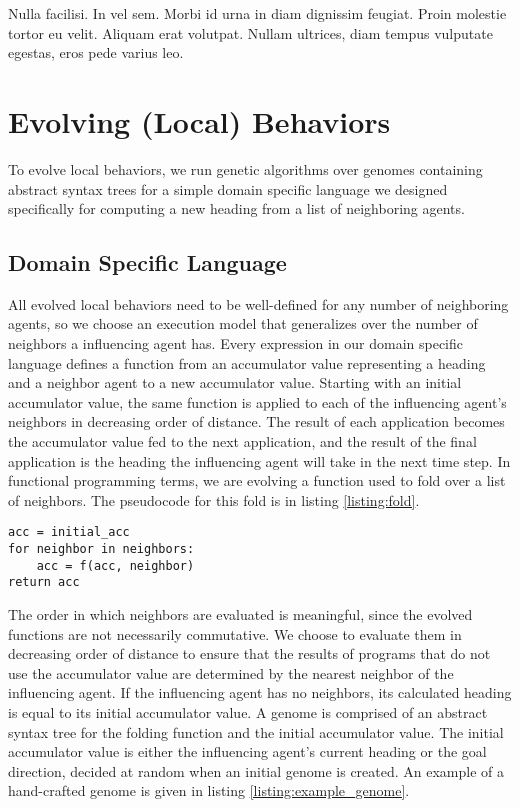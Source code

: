 \begin{savequote}[75mm]
Nulla facilisi. In vel sem. Morbi id urna in diam dignissim feugiat. Proin molestie tortor eu velit. Aliquam erat volutpat. Nullam ultrices, diam tempus vulputate egestas, eros pede varius leo.
\end{savequote}

\chapter{Evolving (Local) Behaviors}

To evolve local behaviors, we run genetic algorithms over genomes containing
abstract syntax trees for a simple domain specific language we designed
specifically for computing a new heading from a list of neighboring agents.

\section{Domain Specific Language}
\label{sec:language}
All evolved local behaviors need to be well-defined for any number of
neighboring agents, so we choose an execution model that generalizes over the
number of neighbors a influencing agent has.
Every expression in our domain specific language defines a function from an
accumulator value representing a heading and a neighbor agent to a new
accumulator value.
Starting with an initial accumulator value, the same function is applied to
each of the influencing agent's neighbors in decreasing order of distance.
The result of each application becomes the accumulator value fed to the next
application, and the result of the final application is the heading the
influencing agent will take in the next time step.
In functional programming terms, we are evolving a function used to fold over a
list of neighbors.
The pseudocode for this fold is in listing \ref{listing:fold}.

\begin{lstlisting}[caption={A fold},captionpos=b,label={listing:fold}]
acc = initial_acc
for neighbor in neighbors:
    acc = f(acc, neighbor)
return acc
\end{lstlisting}

The order in which neighbors are evaluated is meaningful, since the evolved
functions are not necessarily commutative.
We choose to evaluate them in decreasing order of distance to ensure that the
results of programs that do not use the accumulator value are determined by the
nearest neighbor of the influencing agent.
If the influencing agent has no neighbors, its calculated heading is equal to
its initial accumulator value.
A genome is comprised of an abstract syntax tree for the folding function and
the initial accumulator value.
The initial accumulator value is either the influencing agent's current heading
or the goal direction, decided at random when an initial genome is created.
An example of a hand-crafted genome is given in listing
\ref{listing:example_genome}.

